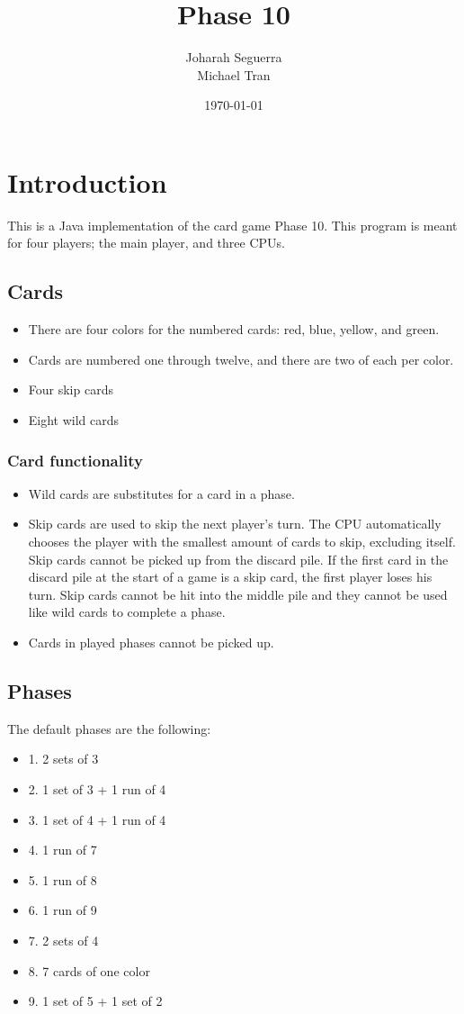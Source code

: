 \documentclass[12pt]{article}
\title{Phase 10}
\author{Joharah Seguerra \\ Michael Tran}
\date{\today}
\begin{document}
\maketitle

\section{Introduction}

This is a Java implementation of the card game Phase 10. This program is meant for four
players; the main player, and three CPUs.

\subsection{Cards}
\begin{itemize}
	\item There are four colors for the numbered cards: red, blue, yellow, and green.
	\item Cards are numbered one through twelve, and there are two of each per color.
	\item Four skip cards
	\item Eight wild cards
\end{itemize}

\subsubsection{Card functionality}

\begin{itemize}
	\item Wild cards are substitutes for a card in a phase.
	\item Skip cards are used to skip the next player's turn. The CPU automatically chooses the
player with the smallest amount of cards to skip, excluding itself. Skip cards cannot be
picked up from the discard pile. If the first card in the discard pile at the start of a
game is a skip card, the first player loses his turn.
Skip cards cannot be hit into the middle pile and they cannot be used like wild cards to
complete a phase.
	\item Cards in played phases cannot be picked up.
\end{itemize}

\subsection{Phases}
The default phases are the following:
\begin{itemize}
	\item 1. 2 sets of 3
	\item 2. 1 set of 3 + 1 run of 4
	\item 3. 1 set of 4 + 1 run of 4
	\item 4. 1 run of 7
	\item 5. 1 run of 8
	\item 6. 1 run of 9
	\item 7. 2 sets of 4
	\item 8. 7 cards of one color
	\item 9. 1 set of 5 + 1 set of 2
\end{itemize}
\end{document}
